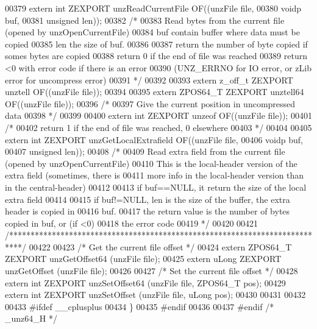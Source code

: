 \begin{DoxyCode}
00379 \textcolor{keyword}{extern} \textcolor{keywordtype}{int} ZEXPORT unzReadCurrentFile OF((unzFile file,
00380                       voidp buf,
00381                       \textcolor{keywordtype}{unsigned} len));
00382 \textcolor{comment}{/*}
00383 \textcolor{comment}{  Read bytes from the current file (opened by unzOpenCurrentFile)}
00384 \textcolor{comment}{  buf contain buffer where data must be copied}
00385 \textcolor{comment}{  len the size of buf.}
00386 \textcolor{comment}{}
00387 \textcolor{comment}{  return the number of byte copied if somes bytes are copied}
00388 \textcolor{comment}{  return 0 if the end of file was reached}
00389 \textcolor{comment}{  return <0 with error code if there is an error}
00390 \textcolor{comment}{    (UNZ\_ERRNO for IO error, or zLib error for uncompress error)}
00391 \textcolor{comment}{*/}
00392 
00393 \textcolor{keyword}{extern} z\_off\_t ZEXPORT unztell OF((unzFile file));
00394 
00395 \textcolor{keyword}{extern} ZPOS64\_T ZEXPORT unztell64 OF((unzFile file));
00396 \textcolor{comment}{/*}
00397 \textcolor{comment}{  Give the current position in uncompressed data}
00398 \textcolor{comment}{*/}
00399 
00400 \textcolor{keyword}{extern} \textcolor{keywordtype}{int} ZEXPORT unzeof OF((unzFile file));
00401 \textcolor{comment}{/*}
00402 \textcolor{comment}{  return 1 if the end of file was reached, 0 elsewhere}
00403 \textcolor{comment}{*/}
00404 
00405 \textcolor{keyword}{extern} \textcolor{keywordtype}{int} ZEXPORT unzGetLocalExtrafield OF((unzFile file,
00406                                              voidp buf,
00407                                              \textcolor{keywordtype}{unsigned} len));
00408 \textcolor{comment}{/*}
00409 \textcolor{comment}{  Read extra field from the current file (opened by unzOpenCurrentFile)}
00410 \textcolor{comment}{  This is the local-header version of the extra field (sometimes, there is}
00411 \textcolor{comment}{    more info in the local-header version than in the central-header)}
00412 \textcolor{comment}{}
00413 \textcolor{comment}{  if buf==NULL, it return the size of the local extra field}
00414 \textcolor{comment}{}
00415 \textcolor{comment}{  if buf!=NULL, len is the size of the buffer, the extra header is copied in}
00416 \textcolor{comment}{    buf.}
00417 \textcolor{comment}{  the return value is the number of bytes copied in buf, or (if <0)}
00418 \textcolor{comment}{    the error code}
00419 \textcolor{comment}{*/}
00420 
00421 \textcolor{comment}{/***************************************************************************/}
00422 
00423 \textcolor{comment}{/* Get the current file offset */}
00424 \textcolor{keyword}{extern} ZPOS64\_T ZEXPORT unzGetOffset64 (unzFile file);
00425 \textcolor{keyword}{extern} uLong ZEXPORT unzGetOffset (unzFile file);
00426 
00427 \textcolor{comment}{/* Set the current file offset */}
00428 \textcolor{keyword}{extern} \textcolor{keywordtype}{int} ZEXPORT unzSetOffset64 (unzFile file, ZPOS64\_T pos);
00429 \textcolor{keyword}{extern} \textcolor{keywordtype}{int} ZEXPORT unzSetOffset (unzFile file, uLong pos);
00430 
00431 
00432 
00433 \textcolor{preprocessor}{#ifdef \_\_cplusplus}
00434 \}
00435 \textcolor{preprocessor}{#endif}
00436 
00437 \textcolor{preprocessor}{#endif }\textcolor{comment}{/* \_unz64\_H */}\textcolor{preprocessor}{}
\end{DoxyCode}
